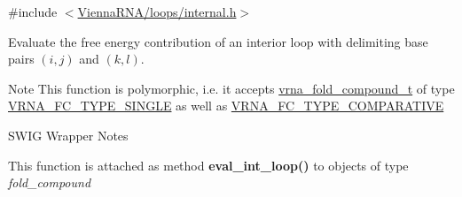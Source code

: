 {\ttfamily \#include $<$\hyperlink{internal_8h}{Vienna\+R\+N\+A/loops/internal.\+h}$>$}



Evaluate the free energy contribution of an interior loop with delimiting base pairs $(i,j)$ and $(k,l)$. 

\begin{DoxyNote}{Note}
This function is polymorphic, i.\+e. it accepts \hyperlink{group__fold__compound_ga1b0cef17fd40466cef5968eaeeff6166}{vrna\+\_\+fold\+\_\+compound\+\_\+t} of type \hyperlink{group__fold__compound_gga01a4ff86fa71deaaa5d1abbd95a1447da7e264dd3cf2dc9b6448caabcb7763cd6}{V\+R\+N\+A\+\_\+\+F\+C\+\_\+\+T\+Y\+P\+E\+\_\+\+S\+I\+N\+G\+LE} as well as \hyperlink{group__fold__compound_gga01a4ff86fa71deaaa5d1abbd95a1447dab821ce46ea3cf665be97df22a76f5023}{V\+R\+N\+A\+\_\+\+F\+C\+\_\+\+T\+Y\+P\+E\+\_\+\+C\+O\+M\+P\+A\+R\+A\+T\+I\+VE}
\end{DoxyNote}
\begin{DoxyRefDesc}{S\+W\+I\+G Wrapper Notes}
\item[\hyperlink{wrappers__wrappers000040}{S\+W\+I\+G Wrapper Notes}]This function is attached as method {\bfseries eval\+\_\+int\+\_\+loop()} to objects of type {\itshape fold\+\_\+compound} \end{DoxyRefDesc}
